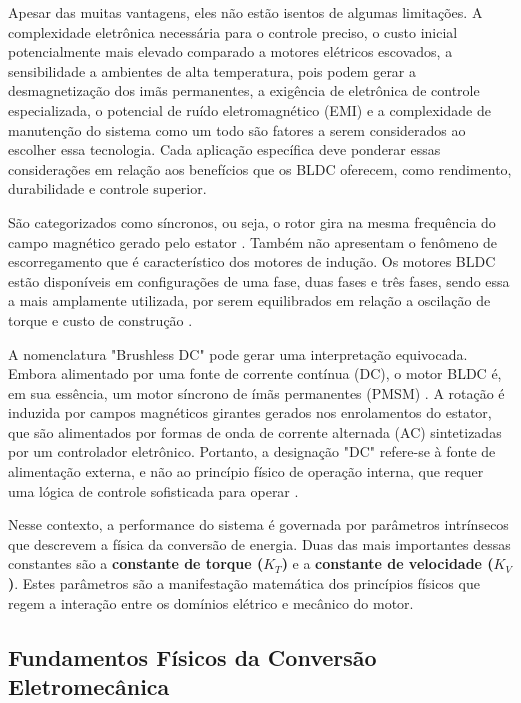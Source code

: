 Apesar das muitas vantagens, eles não estão isentos de algumas limitações. A complexidade eletrônica necessária para o controle preciso, o custo inicial potencialmente mais elevado comparado a motores elétricos escovados, a sensibilidade a ambientes de alta temperatura, pois podem gerar a desmagnetização dos imãs permanentes, a exigência de eletrônica de controle especializada, o potencial de ruído eletromagnético (EMI) e a complexidade de manutenção do sistema como um todo são fatores a serem considerados ao escolher essa tecnologia. Cada aplicação específica deve ponderar essas considerações em relação aos benefícios que os BLDC oferecem, como rendimento, durabilidade e controle superior.

São categorizados como síncronos, ou seja, o rotor gira na mesma frequência do campo magnético gerado pelo estator \cite{jahns1984torque}. Também não apresentam o fenômeno de escorregamento que é característico dos motores de indução. Os motores BLDC estão disponíveis em configurações de uma fase, duas fases e três fases, sendo  essa a mais amplamente utilizada, por serem equilibrados em relação a oscilação de torque e custo de construção \cite{hendershot1994design}.

A nomenclatura "Brushless DC" pode gerar uma interpretação equivocada. Embora alimentado por uma fonte de corrente contínua (DC), o motor BLDC é, em sua essência, um motor síncrono de ímãs permanentes (PMSM) \parencite{maquinasEletricasFitzgerald}. A rotação é induzida por campos magnéticos girantes gerados nos enrolamentos do estator, que são alimentados por formas de onda de corrente alternada (AC) sintetizadas por um controlador eletrônico. Portanto, a designação "DC" refere-se à fonte de alimentação externa, e não ao princípio físico de operação interna, que requer uma lógica de controle sofisticada para operar \parencite{ti2013sensorless}.

Nesse contexto, a performance do sistema é governada por parâmetros intrínsecos que descrevem a física da conversão de energia. Duas das mais importantes dessas constantes são a \textbf{constante de torque ($K_T$)} e a \textbf{constante de velocidade ($K_V$)}. Estes parâmetros são a manifestação matemática dos princípios físicos que regem a interação entre os domínios elétrico e mecânico do motor.

\subsection{Fundamentos Físicos da Conversão Eletromecânica}

